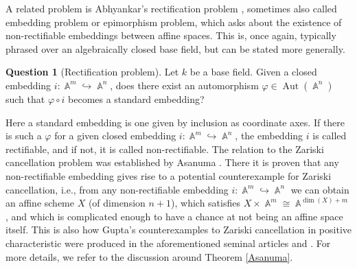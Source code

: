\documentclass[english]{amsart}
\theoremstyle{definition}
\newtheorem*{quest*}{Question}
\DeclareMathOperator{\A}{\mathbb{A}}
\DeclareMathOperator{\Aut}{Aut}
\begin{document}
\hfill

A related problem is Abhyankar's rectification problem \cite{AbMoh}, sometimes also called embedding problem or epimorphism problem, which asks about the existence of non-rectifiable embeddings between affine spaces. This is, once again, typically phrased over an algebraically closed base field, but can be stated more generally.

\begin{quest*}[Rectification problem]\label{RectifiabilityIntro}
Let $k$ be a base field. Given a closed embedding $i \colon \A^m \hookrightarrow \A^n$, does there exist an automorphism $\varphi \in \Aut(\A^n)$ such that $\varphi \circ i$ becomes a standard embedding?
\end{quest*}
Here a standard embedding is one given by inclusion as coordinate axes. If there is such a $\varphi$ for a given closed embedding $i \colon \A^m \hookrightarrow \A^n$, the embedding $i$ is called rectifiable, and if not, it is called non-rectifiable. The relation to the Zariski cancellation problem was established by Asanuma \cite{MR1720185}. There it is proven that any non-rectifiable embedding gives rise to a potential counterexample for Zariski cancellation, i.e., from any non-rectifiable embedding $i \colon \A^m \hookrightarrow \A^n$ we can obtain an affine scheme $X$ (of dimension $n+1$), which satisfies $X \times \A^m \cong \A^{\dim(X) + m}$, and which is complicated enough to have a chance at not being an affine space itself. This is also how Gupta's counterexamples to Zariski cancellation in positive characteristic were produced in the aforementioned seminal articles \cite{MR3148104} and \cite{MR3250286}. For more details, we refer to the discussion around Theorem \ref{Asanuma}.
\end{document}
